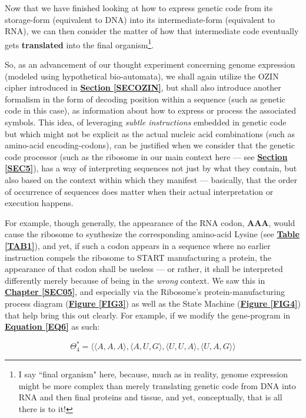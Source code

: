 \documentclass[a4paper, 18pt]{book} %
\begin{document}
Now that we have finished looking at how to express genetic code from its storage-form (equivalent to DNA) into its intermediate-form (equivalent to RNA), we can then consider the matter of how that intermediate code eventually gets \textbf{translated} into the final organism\footnote{I say ``final organism" here, because, much as in reality, genome expression might be more complex than merely translating genetic code from DNA into RNA and then final proteins and tissue, and yet, conceptually, that is all there is to it!}.

So, as an advancement of our thought experiment concerning genome expression (modeled using hypothetical bio-automata), we shall again utilize the OZIN cipher introduced in \textbf{\hyperref[SECOZIN]{Section \ref{SECOZIN}}}, but shall also introduce another formalism in the form of decoding position within a sequence (such as genetic code in this case), as information about how to express or process the associated symbols. This idea, of leveraging \textit{subtle instructions} embedded in genetic code but which might not be explicit as the actual nucleic acid combinations (such as amino-acid encoding-codons), can be justified when we consider that the genetic code processor (such as the ribosome in our main context here --- see \textbf{\hyperref[SEC5]{Section \ref{SEC5}}}), has a way of interpreting sequences not just by what they contain, but also based on the context within which they manifest --- basically, that the order of occurrence of sequences does matter when their actual interpretation or execution happens. 

For example, though generally, the appearance of the RNA codon, \textbf{AAA}, would cause the ribosome to synthesize the corresponding amino-acid Lysine (see \textbf{\hyperref[TAB1]{Table \ref{TAB1}}}), and yet, if such a codon appears in a sequence where no earlier instruction compels the ribosome to START manufacturing a protein, the appearance of that codon shall be useless --- or rather, it shall be interpreted differently merely because of being in the \textit{wrong} context. We saw this in \textbf{\hyperref[SEC05]{Chapter \ref{SEC05}}}, and especially via the Ribosome's protein-manufacturing process diagram (\textbf{\hyperref[FIG3]{Figure \ref{FIG3}}}) as well as the State Machine (\textbf{\hyperref[FIG4]{Figure \ref{FIG4}}}) that help bring this out clearly. For example, if we modify the gene-program  in \textbf{\hyperref[EQ6]{Equation \ref{EQ6}}} as such:

\vspace{1em}
 \begin{equation}
\label{EQ6B}
\Theta_4^* = \langle \langle A, A, A \rangle, \langle A, U, G \rangle, \langle U, U, A \rangle, \langle U, A, G \rangle \rangle
\end{equation}
\vspace{1em}
\end{document}
